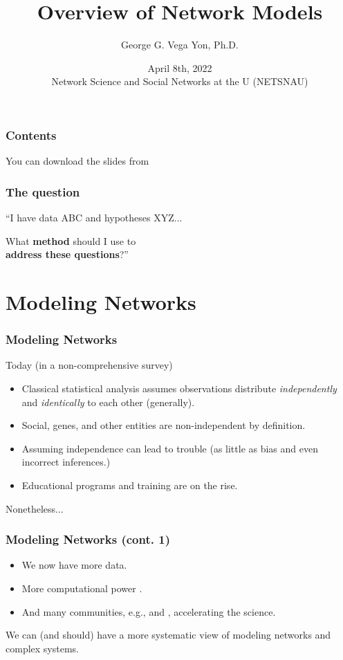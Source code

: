 \documentclass[aspectratio=169,10pt]{beamer}
\title[Network Models]{Overview of Network Models}
\author[ggvy.cl]{George G. Vega Yon, Ph.D.}
\date{April 8th, 2022\\Network Science and Social Networks at the U (NETSNAU)}
\institute[UofU Epi]{Division of Epidemiology\\University of Utah}
\begin{document}

\begin{frame}
	\frametitle{Contents}
\tableofcontents\pause
\vfill\hfill%
You can download the slides from \href{https://ggv.cl/slides/netsnau0}{}
\end{frame}

\begin{frame}
	\frametitle{The question}
	``I have data ABC and hypotheses XYZ...\pause \bigskip
	\hfill\begin{minipage}{.8\linewidth}
		\raggedleft
		\Large What \textbf{method} should I use to\\\textbf{address these questions}?''
	\end{minipage}
\end{frame}

\section{Modeling Networks}


\begin{frame}
	\frametitle{Modeling Networks}
	Today (in a non-comprehensive survey)
	\pause
	\begin{itemize}
		\item Classical statistical analysis assumes observations distribute \textit{independently} and \textit{identically} to each other\pause{} (generally).\pause
		\item Social, genes, and other entities are non-independent by definition.\pause
		\item Assuming independence can lead to trouble (as little as bias and even incorrect inferences.)\pause
		\item Educational programs and training are on the rise.
	\end{itemize}\pause
	\vfill\hfill Nonetheless...
	\end{frame}

\begin{frame}
	\frametitle{Modeling Networks (cont. 1)}
	\begin{itemize}
		\item We now have more data.\pause
		\item More computational power \parencite{Hofman2021,Lazer2020}.\pause
		\item And many communities, e.g., \href{INSNA}{} and \href{NetSCi}{}, accelerating the science.\pause
\end{itemize}

\vfill\hfill\large We can (and should) have a more systematic view of modeling networks and complex systems.

\end{frame}
\end{document}
